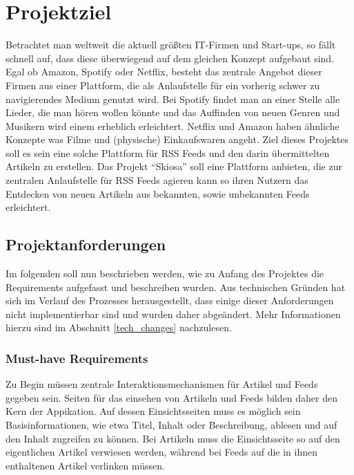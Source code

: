 
\chapter{Projektziel}

Betrachtet man weltweit die aktuell größten IT-Firmen und Start-ups, so fällt schnell auf, dass diese überwiegend auf dem gleichen Konzept aufgebaut sind.
Egal ob Amazon, Spotify oder Netflix, besteht das zentrale Angebot dieser Firmen aus einer Plattform, die als Anlaufstelle für ein vorherig schwer zu navigierendes Medium genutzt wird.
Bei Spotify findet man an einer Stelle alle Lieder, die man hören wollen könnte und das Auffinden von neuen Genren und Musikern wird einem erheblich erleichtert.
Netflix und Amazon haben ähnliche Konzepte was Filme und (physische) Einkaufswaren angeht.
Ziel dieses Projektes soll es sein eine solche Plattform für RSS Feeds und den darin übermittelten Artikeln zu erstellen.
Das Projekt ``Skiosa'' soll eine Plattform anbieten, die zur zentralen Anlaufstelle für RSS Feeds agieren kann so ihren Nutzern das Entdecken von neuen Artikeln aus bekannten, sowie unbekannten Feeds erleichtert.

\section{Projektanforderungen}
Im folgenden soll nun beschrieben werden, wie zu Anfang des Projektes die Requirements aufgefasst und beschreiben wurden.
Aus technischen Gründen hat sich im Verlauf des Prozesses herausgestellt, dass einige dieser Anforderungen nicht implementierbar sind und wurden daher abgeändert.
Mehr Informationen hierzu sind im Abschnitt \ref{tech_changes} nachzulesen.

\subsection{Must-have Requirements}
Zu Begin müssen zentrale Interaktionsmechanismen für Artikel und Feeds gegeben sein.
Seiten für das einsehen von Artikeln und Feeds bilden daher den Kern der Appikation.
Auf dessen Einsichtsseiten muss es möglich sein Basisinformationen, wie etwa Titel, Inhalt oder Beschreibung, ablesen und auf den Inhalt zugreifen zu können.
Bei Artikeln muss die Einsichtsseite so auf den eigentlichen Artikel verwiesen werden, während bei Feeds auf die in ihnen enthaltenen Artikel verlinken müssen.

